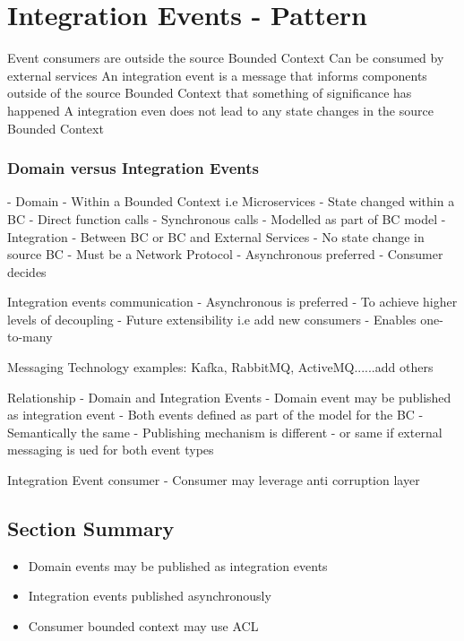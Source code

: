 \documentclass[a4paper, 11pt]{book}
\begin{document}
    \section{Integration Events - Pattern}
    Event consumers are outside the source Bounded Context
    Can be consumed by external services
    An integration event is a message that informs components outside of the source Bounded Context that something of significance has happened
    A integration even does not lead to any state changes in the source Bounded Context

    \subsubsection{Domain versus Integration Events}
    - Domain
    - Within a Bounded Context i.e Microservices
    - State changed within a BC
    - Direct function calls
    - Synchronous calls
    - Modelled as part of BC model
    - Integration
    - Between BC or BC and External Services
    - No state change in source BC
    - Must be a Network Protocol
    - Asynchronous preferred
    - Consumer decides

    Integration events communication
    - Asynchronous is preferred
    - To achieve higher levels of decoupling
    - Future extensibility i.e add new consumers
    - Enables one-to-many

    Messaging Technology examples: Kafka, RabbitMQ, ActiveMQ......add others

    Relationship - Domain and Integration Events
    - Domain event may be published as integration event
    - Both events defined as part of the model for the BC
    - Semantically the same
    - Publishing mechanism is different - or same if external messaging is ued for both event types

    Integration Event consumer
    - Consumer may leverage anti corruption layer

    \subsection{Section Summary}
    \begin{itemize}
        \item Domain events may be published as integration events
        \item Integration events published asynchronously
        \item Consumer bounded context may use ACL
    \end{itemize}
\end{document}
